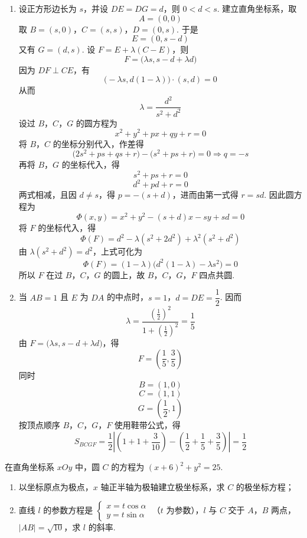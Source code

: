 \begin{solution}
\begin{enumerate}
\item 设正方形边长为 \(s\)，并设 \(DE=DG=d\)，则 \(0<d<s\). 建立直角坐标系，取
\[
A=(0,0)
\]
取 \(B=(s,0)\)，\(C=(s,s)\)，\(D=(0,s)\). 于是
\[
E=(0,s-d)
\]
又有 \(G=(d,s)\).
设 \(F=E+\lambda(C-E)\)，则
\[
F=\bigl(\lambda s,s-d+\lambda d\bigr)
\]
因为 \(DF\perp CE\)，有
\[
\bigl(-\lambda s,d(1-\lambda)\bigr)\cdot(s,d)=0
\]
从而
\[
\lambda=\dfrac{d^2}{s^2+d^2}
\]
设过 \(B\)，\(C\)，\(G\) 的圆方程为
\[
x^2+y^2+px+qy+r=0
\]
将 \(B\)，\(C\) 的坐标分别代入，作差得
\[
\bigl(2s^2+ps+qs+r\bigr)-\bigl(s^2+ps+r\bigr)=0
\Longrightarrow q=-s
\]
再将 \(B\)，\(G\) 的坐标代入，得
\[
s^2+ps+r=0
\]
\[
d^2+pd+r=0
\]
两式相减，且因 \(d\neq s\)，得 \(p=-(s+d)\)，进而由第一式得 \(r=sd\). 因此圆方程为
\[
\Phi(x,y)=x^2+y^2-(s+d)x-sy+sd=0
\]
将 \(F\) 的坐标代入，得
\[
\Phi(F)=d^2-\lambda(s^2+2d^2)+\lambda^2(s^2+d^2)
\]
由 \(\lambda(s^2+d^2)=d^2\)，上式可化为
\[
\Phi(F)=(1-\lambda)\bigl(d^2(1-\lambda)-\lambda s^2\bigr)=0
\]
所以 \(F\) 在过 \(B\)，\(C\)，\(G\) 的圆上，故 \(B\)，\(C\)，\(G\)，\(F\) 四点共圆.

\item 当 \(AB=1\) 且 \(E\) 为 \(DA\) 的中点时，\(s=1\)，\(d=DE=\dfrac12\). 因而
\[
\lambda=\dfrac{(\frac{1}{2})^2}{1+(\frac{1}{2})^2}=\dfrac15
\]
由 \(F=\bigl(\lambda s,s-d+\lambda d\bigr)\)，得
\[
F=\left(\dfrac15,\dfrac35\right)
\]
同时
\[
B=(1,0)
\]
\[
C=(1,1)
\]
\[
G=\left(\dfrac12,1\right)
\]
按顶点顺序 \(B\)，\(C\)，\(G\)，\(F\) 使用鞋带公式，得
\[
S_{BCGF}=\dfrac12\left|\left(1+1+\dfrac3{10}\right)-\left(\dfrac12+\dfrac15+\dfrac35\right)\right|=\dfrac12
\]
\end{enumerate}
\end{solution}


\begin{problem}
在直角坐标系 \(xOy\) 中，圆 \(C\) 的方程为 \((x+6)^2+y^2=25\).
\begin{enumerate}
\item 以坐标原点为极点，\(x\) 轴正半轴为极轴建立极坐标系，求 \(C\) 的极坐标方程；
\item 直线 \(l\) 的参数方程是
\(\begin{cases}
x=t\cos\alpha\\
y=t\sin\alpha
\end{cases}\)
（\(t\) 为参数），\(l\) 与 \(C\) 交于 \(A\)，\(B\) 两点，\(\lvert AB\rvert=\sqrt{10}\)，求 \(l\) 的斜率.
\end{enumerate}
\end{problem}

